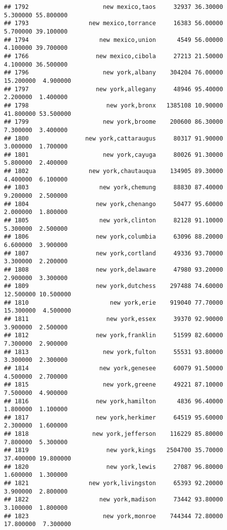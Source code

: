 \documentclass[
]{article}
\begin{document}
\begin{verbatim}
## 1792                     new mexico,taos     32937 36.30000  5.300000 55.800000
## 1793                 new mexico,torrance     16383 56.00000  5.700000 39.100000
## 1794                    new mexico,union      4549 56.00000  4.100000 39.700000
## 1766                   new mexico,cibola     27213 21.50000  4.100000 36.500000
## 1796                     new york,albany    304204 76.00000 15.200000  4.900000
## 1797                   new york,allegany     48946 95.40000  2.200000  1.400000
## 1798                      new york,bronx   1385108 10.90000 41.800000 53.500000
## 1799                     new york,broome    200600 86.30000  7.300000  3.400000
## 1800                new york,cattaraugus     80317 91.90000  3.000000  1.700000
## 1801                     new york,cayuga     80026 91.30000  5.800000  2.400000
## 1802                 new york,chautauqua    134905 89.30000  4.400000  6.100000
## 1803                    new york,chemung     88830 87.40000  9.200000  2.500000
## 1804                   new york,chenango     50477 95.60000  2.000000  1.800000
## 1805                    new york,clinton     82128 91.10000  5.300000  2.500000
## 1806                   new york,columbia     63096 88.20000  6.600000  3.900000
## 1807                   new york,cortland     49336 93.70000  3.300000  2.200000
## 1808                   new york,delaware     47980 93.20000  2.900000  3.300000
## 1809                   new york,dutchess    297488 74.60000 12.500000 10.500000
## 1810                       new york,erie    919040 77.70000 15.300000  4.500000
## 1811                      new york,essex     39370 92.90000  3.900000  2.500000
## 1812                   new york,franklin     51599 82.60000  7.300000  2.900000
## 1813                     new york,fulton     55531 93.80000  3.300000  2.300000
## 1814                    new york,genesee     60079 91.50000  4.500000  2.700000
## 1815                     new york,greene     49221 87.10000  7.500000  4.900000
## 1816                   new york,hamilton      4836 96.40000  1.800000  1.100000
## 1817                   new york,herkimer     64519 95.60000  2.300000  1.600000
## 1818                  new york,jefferson    116229 85.80000  7.800000  5.300000
## 1819                      new york,kings   2504700 35.70000 37.400000 19.800000
## 1820                      new york,lewis     27087 96.80000  1.600000  1.300000
## 1821                 new york,livingston     65393 92.20000  3.900000  2.800000
## 1822                    new york,madison     73442 93.80000  3.100000  1.800000
## 1823                     new york,monroe    744344 72.80000 17.800000  7.300000

\end{verbatim}
\end{document}
